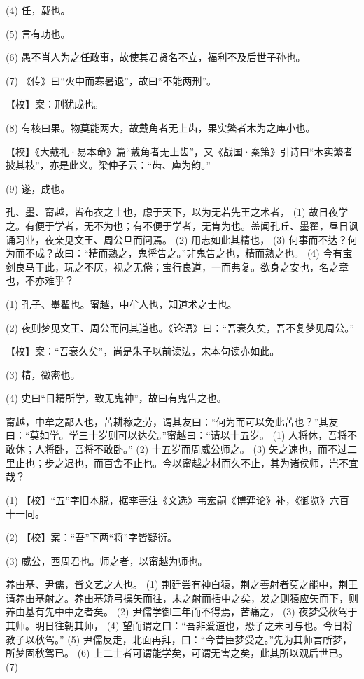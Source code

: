 \documentclass[12pt,UTF8]{ctexbook}
\begin{document}
(4) 任，载也。

(5) 言有功也。

(6) 愚不肖人为之任政事，故使其君贤名不立，福利不及后世子孙也。

(7) 《传》曰“火中而寒暑退”，故曰“不能两刑”。

【校】案：刑犹成也。

(8) 有核曰果。物莫能两大，故戴角者无上齿，果实繁者木为之庳小也。

【校】《大戴礼·易本命》篇“戴角者无上齿”，又《战国·秦策》引诗曰“木实繁者披其枝”，亦是此义。梁仲子云：“齿、庳为韵。”

(9) 遂，成也。

孔、墨、甯越，皆布衣之士也，虑于天下，以为无若先王之术者， (1) 故日夜学之。有便于学者，无不为也；有不便于学者，无肯为也。盖闻孔丘、墨翟，昼日讽诵习业，夜亲见文王、周公旦而问焉。 (2) 用志如此其精也， (3) 何事而不达？何为而不成？故曰：“精而熟之，鬼将告之。”非鬼告之也，精而熟之也。 (4) 今有宝剑良马于此，玩之不厌，视之无倦；宝行良道，一而弗复。欲身之安也，名之章也，不亦难乎？

(1) 孔子、墨翟也。甯越，中牟人也，知道术之士也。

(2) 夜则梦见文王、周公而问其道也。《论语》曰：“吾衰久矣，吾不复梦见周公。”

【校】案：“吾衰久矣”，尚是朱子以前读法，宋本句读亦如此。

(3) 精，微密也。

(4) 史曰“日精所学，致无鬼神”，故曰有鬼告之也。

甯越，中牟之鄙人也，苦耕稼之劳，谓其友曰：“何为而可以免此苦也？”其友曰：“莫如学。学三十岁则可以达矣。”甯越曰：“请以十五岁。 (1) 人将休，吾将不敢休；人将卧，吾将不敢卧。” (2) 十五岁而周威公师之。 (3) 矢之速也，而不过二里止也；步之迟也，而百舍不止也。今以甯越之材而久不止，其为诸侯师，岂不宜哉？

(1) 【校】“五”字旧本脱，据李善注《文选》韦宏嗣《博弈论》补，《御览》六百十一同。

(2) 【校】案：“吾”下两“将”字皆疑衍。

(3) 威公，西周君也。师之者，以甯越为师也。

养由基、尹儒，皆文艺之人也。 (1) 荆廷尝有神白猿，荆之善射者莫之能中，荆王请养由基射之。养由基矫弓操矢而往，未之射而括中之矣，发之则猿应矢而下，则养由基有先中中之者矣。 (2) 尹儒学御三年而不得焉，苦痛之， (3) 夜梦受秋驾于其师。明日往朝其师， (4) 望而谓之曰：“吾非爱道也，恐子之未可与也。今日将教子以秋驾。” (5) 尹儒反走，北面再拜，曰：“今昔臣梦受之。”先为其师言所梦，所梦固秋驾已。 (6) 上二士者可谓能学矣，可谓无害之矣，此其所以观后世已。 (7)
\end{document}
